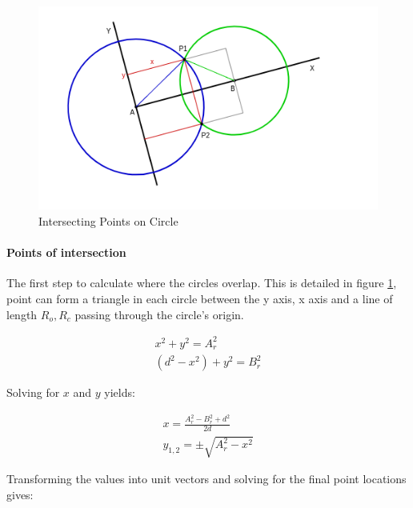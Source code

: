 \documentclass[11pt,twoside]{report}
\begin{document}
\noindent \begin{figure}[h!]
	\includegraphics[width = 1.0\hsize]{figures/points_intersecting_circles.png}
	\caption{Intersecting Points on Circle \cite{circle_intersection_point}}
	\label{two_intersect_points}
\end{figure}


\paragraph{Points of intersection}
The first step to calculate where the circles overlap. This is detailed in figure \ref{two_intersect_points}, point can form a triangle in each circle between the y axis, x axis and a line of length $R_{o},R_{c}$ passing through the circle's origin.


\begin{equation}
\begin{aligned}
x^{2} + y^{2} = A_{r}^{2} \\
(d^{2}-x^{2}) + y^{2} = B_{r}^{2}
\end{aligned}
\label{inter_point_eq1}
\end{equation}


Solving for $x$ and $y$ yields:

\begin{equation}
\begin{aligned}
x = \frac{A_{r}^{2} - B_{r}^{2} + d^{2}}{2d} \\
y_{1,2} = \pm \sqrt{A_{r}^{2} - x^{2}}
\end{aligned}
\label{inter_point_eq2}
\end{equation}

Transforming the values into unit vectors and solving for the final point locations gives:
\end{document}
